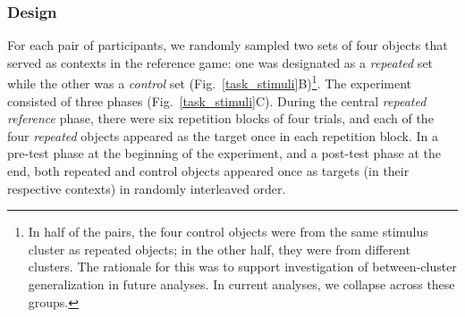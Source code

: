 \documentclass[10pt,letterpaper]{article}
\begin{document}


\subsubsection{Design}
For each pair of participants, we randomly sampled two sets of four objects that served as contexts in the reference game: one was designated as a \emph{repeated} set while the other was a \emph{control} set (Fig.~\ref{task_stimuli}B)\footnote{In half of the pairs, the four control objects were from the same stimulus cluster as repeated objects; in the other half, they were from different clusters. The rationale for this was to support investigation of between-cluster generalization in future analyses. In current analyses, we collapse across these groups.}.%
The experiment consisted of three phases (Fig.~\ref{task_stimuli}C).
During the central \textit{repeated reference} phase, there were six repetition blocks of four trials, and each of the four \emph{repeated} objects appeared as the target once in each repetition block.
In a pre-test phase at the beginning of the experiment, and a post-test phase at the end, both repeated and control objects appeared once as targets (in their respective contexts) in randomly interleaved order.
\end{document}
